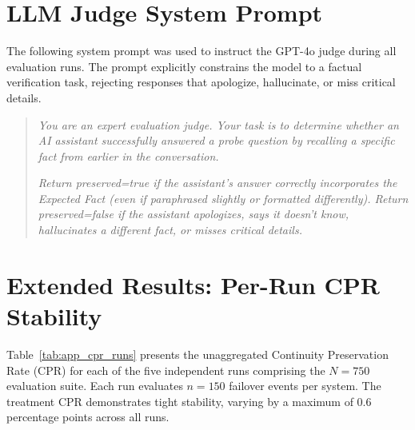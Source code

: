 \appendix

\section{LLM Judge System Prompt}
\label{app:judge_prompt}

The following system prompt was used to instruct the GPT-4o judge during all evaluation runs. The prompt explicitly constrains the model to a factual verification task, rejecting responses that apologize, hallucinate, or miss critical details.

\begin{quote}
\small
\textit{You are an expert evaluation judge. Your task is to determine whether an AI assistant successfully answered a probe question by recalling a specific fact from earlier in the conversation.}

\textit{Return preserved=true if the assistant's answer correctly incorporates the Expected Fact (even if paraphrased slightly or formatted differently). Return preserved=false if the assistant apologizes, says it doesn't know, hallucinates a different fact, or misses critical details.}
\end{quote}

\section{Extended Results: Per-Run CPR Stability}
\label{app:extended_results}

Table~\ref{tab:app_cpr_runs} presents the unaggregated Continuity Preservation Rate (CPR) for each of the five independent runs comprising the $N=750$ evaluation suite. Each run evaluates $n=150$ failover events per system. The treatment CPR demonstrates tight stability, varying by a maximum of 0.6 percentage points across all runs.

